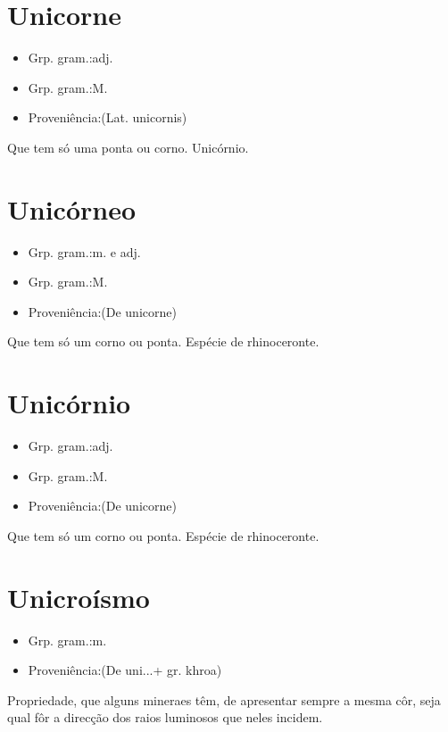 \documentclass{article}
\begin{document}
\section{Unicorne}
\begin{itemize}
\item {Grp. gram.:adj.}
\end{itemize}
\begin{itemize}
\item {Grp. gram.:M.}
\end{itemize}
\begin{itemize}
\item {Proveniência:(Lat. \textunderscore unicornis\textunderscore )}
\end{itemize}
Que tem só uma ponta ou corno.
Unicórnio.
\section{Unicórneo}
\begin{itemize}
\item {Grp. gram.:m.  e  adj.}
\end{itemize}
\begin{itemize}
\item {Grp. gram.:M.}
\end{itemize}
\begin{itemize}
\item {Proveniência:(De \textunderscore unicorne\textunderscore )}
\end{itemize}
Que tem só um corno ou ponta.
Espécie de rhinoceronte.
\section{Unicórnio}
\begin{itemize}
\item {Grp. gram.:adj.}
\end{itemize}
\begin{itemize}
\item {Grp. gram.:M.}
\end{itemize}
\begin{itemize}
\item {Proveniência:(De \textunderscore unicorne\textunderscore )}
\end{itemize}
Que tem só um corno ou ponta.
Espécie de rhinoceronte.
\section{Unicroísmo}
\begin{itemize}
\item {Grp. gram.:m.}
\end{itemize}
\begin{itemize}
\item {Proveniência:(De \textunderscore uni...\textunderscore  + gr. \textunderscore khroa\textunderscore )}
\end{itemize}
Propriedade, que alguns mineraes têm, de apresentar sempre a mesma côr, seja qual fôr a direcção dos raios luminosos que neles incidem.
\end{document}
